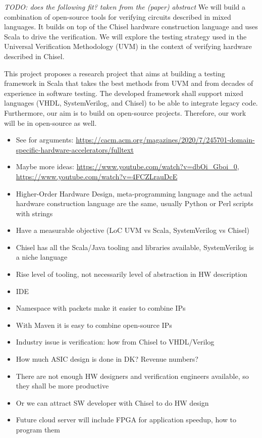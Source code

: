 \documentclass[fleqn,12pt]{article}
\newcommand{\todo}[1]{{\it TODO: #1}}
\begin{document}
\todo{does the following fit? taken from the (paper) abstract} 
We will build a combination of open-source tools for verifying
circuits described in mixed languages. It builds on top of the Chisel
hardware construction language and uses Scala to drive the verification. 
We will explore the testing strategy used in the Universal Verification Methodology
(UVM) in the context of verifying hardware described in Chisel.


This project proposes a research project that aims at building a testing framework
in Scala that takes the best methods from UVM and from decades of experience
in software testing.
The developed framework shall support mixed languages (VHDL, SystemVerilog, and Chisel)
to be able to integrate legacy code.
Furthermore, our aim is to build on open-source projects. Therefore, our
work will be in open-source as well.

\begin{itemize}
\item See for arguments: \url{https://cacm.acm.org/magazines/2020/7/245701-domain-specific-hardware-accelerators/fulltext}
\item Maybe more ideas: \url{https://www.youtube.com/watch?v=dbOi_Gboi_0}, \url{https://www.youtube.com/watch?v=4FCZLrauDcE}
\item Higher-Order Hardware Design, meta-programming language and the actual hardware construction language are the same, usually Python or Perl scripts with strings
\item Have a measurable objective (LoC UVM vs Scala, SystemVerilog vs Chisel)
\item Chisel has all the Scala/Java tooling and libraries available, SystemVerilog is a niche language
\item Rise level of tooling, not necessarily level of abstraction in HW description
\item IDE
\item Namespace with packets make it easier to combine IPs
\item With Maven it is easy to combine open-source IPs
\item Industry issue is verification: how from Chisel to VHDL/Verilog
\item How much ASIC design is done in DK? Revenue numbers?
\item There are not enough HW designers and verification engineers available, so they shall be more productive
\item Or we can attract SW developer with Chisel to do HW design
\item Future cloud server will include FPGA for application speedup, how to program them
\end{itemize}
\end{document}
